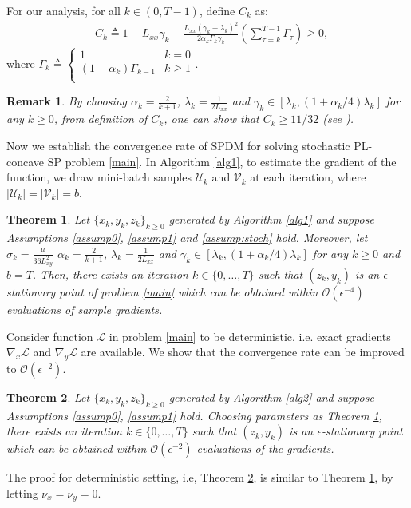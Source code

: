\documentclass[letterpaper,11 pt]{article}
\newtheorem{theorem}{Theorem}
\newtheorem{remark}{Remark}
\def\ml{\mathcal L}
\begin{document}
For our analysis, for all $k\in(0,T-1)$,  define $C_k$ as:
\begin{align}\label{align1}
&C_k\triangleq 1-L_{xx}\gamma_k-\tfrac{L_{xx}(\gamma_k-\lambda_k)^2}{2\alpha_k\Gamma_k\gamma_k}\left(\sum_{\tau=k}^{T-1} \Gamma_\tau\right)\geq 0,
\end{align}
where $ \Gamma_k \triangleq
    \begin{cases}
      1 & k=0\\
      (1-\alpha_k)\Gamma_{k-1} & k\geq1\\
    \end{cases}.$
\begin{remark}
By choosing $\alpha_k=\tfrac{2}{k+1}$, $\lambda_k=\tfrac{1}{2L_{xx}}$ and $\gamma_k\in [\lambda_k,(1+\alpha_k/4)\lambda_k]$ for any $k\geq 0$, from definition of $C_k$, one can show that $C_k\geq 11/32$ (see \cite{ghadimi2016accelerated}).
\end{remark}
Now we establish the convergence rate of SPDM for solving stochastic PL-concave SP problem \eqref{main}. In Algorithm \ref{alg1}, to estimate the gradient of the function, we draw mini-batch samples $\mathcal U_k$ and $\mathcal V_k$ at each iteration, where $|\mathcal U_k|=|\mathcal V_k|=b$. 
\begin{theorem}\label{th1}
Let $\{x_k, y_{k},z_k\}_{{k} \geq0}$ generated by Algorithm \ref{alg1} and suppose Assumptions \ref{assump0}, \ref{assump1} and \ref{assump:stoch} hold.
 Moreover, let $\sigma_k= \tfrac{\mu}{36L^2_{xy}}$ $\alpha_k=\tfrac{2}{k+1}$, $\lambda_k=\tfrac{1}{2L_{xx}}$ and $\gamma_k\in [\lambda_k,(1+\alpha_k/4)\lambda_k]$ for any $k\geq 0$ and $b=T$. Then,  there exists an iteration $k\in\{0,\hdots,T\}$ such that $(z_k,y_k)$ is an $\epsilon$-stationary point of problem \eqref{main} which can be obtained within $\mathcal O(\epsilon^{-4})$ evaluations of sample gradients. 
\end{theorem}




Consider function $\ml$ in problem \eqref{main} to be deterministic, i.e. exact gradients $\nabla_x \ml$ and $\nabla_y \ml$ are available. We show that the convergence rate can be improved to $\mathcal O(\epsilon^{-2})$. 
\begin{theorem}\label{th2}
Let $\{x_k, y_{k},z_k\}_{{k} \geq0}$ generated by Algorithm \ref{alg2} and suppose Assumptions \ref{assump0}, \ref{assump1} hold.
 Choosing parameters as Theorem \ref{th1}, there exists an iteration $k\in\{0,\hdots,T\}$ such that $(z_k,y_k)$ is an $\epsilon$-stationary point which can be obtained within $\mathcal O(\epsilon^{-2})$ evaluations of the gradients. 
\end{theorem}
The proof for deterministic setting, i.e, Theorem \ref{th2}, is similar to Theorem \ref{th1}, by letting $\nu_x=\nu_y=0$.
\end{document}

